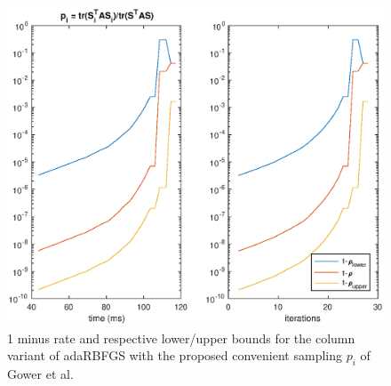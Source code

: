 \documentclass[12pt,conference,compsocconf]{IEEEtran}
\begin{document}
\begin{figure}[H]
  \centering
  \includegraphics[height=0.7\columnwidth,width=1.1\columnwidth]{ratetr.eps}
  
  \vspace{-2mm}
  \caption{1 minus rate and respective lower/upper bounds for the column variant of adaRBFGS with the proposed convenient sampling $p_i$ of Gower et al. \cite{Gower1} \label{fig:ratetr}}  
  
\end{figure}
\end{document}
